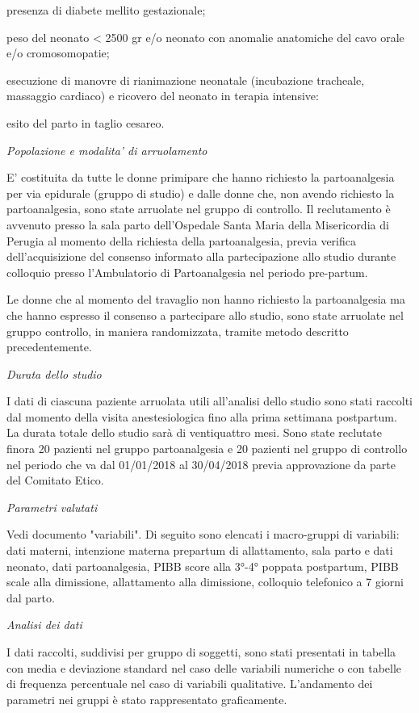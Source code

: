 \documentclass[]{article}
\begin{document}
presenza di diabete mellito gestazionale;

peso del neonato \textless{} 2500 gr e/o neonato con anomalie anatomiche
del cavo orale e/o cromosomopatie;

esecuzione di manovre di rianimazione neonatale (incubazione tracheale,
massaggio cardiaco) e ricovero del neonato in terapia intensive:

esito del parto in taglio cesareo.

\emph{Popolazione e modalita' di arruolamento}

E' costituita da tutte le donne primipare che hanno richiesto la
partoanalgesia per via epidurale (gruppo di studio) e dalle donne che,
non avendo richiesto la partoanalgesia, sono state arruolate nel gruppo
di controllo. Il reclutamento è avvenuto presso la sala parto
dell'Ospedale Santa Maria della Misericordia di Perugia al momento della
richiesta della partoanalgesia, previa verifica dell'acquisizione del
consenso informato alla partecipazione allo studio durante colloquio
presso l'Ambulatorio di Partoanalgesia nel periodo pre-partum.

Le donne che al momento del travaglio non hanno richiesto la
partoanalgesia ma che hanno espresso il consenso a partecipare allo
studio, sono state arruolate nel gruppo controllo, in maniera
randomizzata, tramite metodo descritto precedentemente.

\emph{Durata dello studio }

I dati di ciascuna paziente arruolata utili all'analisi dello studio
sono stati raccolti dal momento della visita anestesiologica fino alla
prima settimana postpartum. La durata totale dello studio sarà di
ventiquattro mesi. Sono state reclutate finora 20 pazienti nel gruppo
partoanalgesia e 20 pazienti nel gruppo di controllo nel periodo che va
dal 01/01/2018 al 30/04/2018 previa approvazione da parte del Comitato
Etico.

\emph{Parametri valutati }

Vedi documento "variabili". Di seguito sono elencati i macro-gruppi di
variabili: dati materni, intenzione materna prepartum di allattamento,
sala parto e dati neonato, dati partoanalgesia, PIBB score alla 3°-4°
poppata postpartum, PIBB scale alla dimissione, allattamento alla
dimissione, colloquio telefonico a 7 giorni dal parto.

\emph{Analisi dei dati}

I dati raccolti, suddivisi per gruppo di soggetti, sono stati presentati
in tabella con media e deviazione standard nel caso delle variabili
numeriche o con tabelle di frequenza percentuale nel caso di variabili
qualitative. L'andamento dei parametri nei gruppi è stato rappresentato
graficamente.
\end{document}
